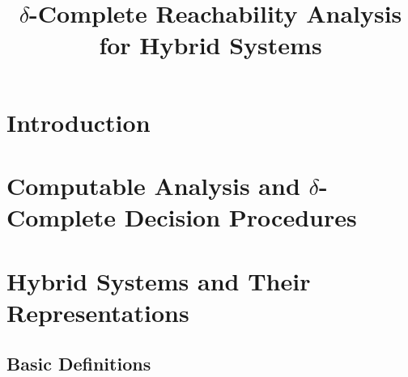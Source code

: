 \documentclass[envcountsect]{llncs}
\title{$\delta$-Complete Reachability Analysis for Hybrid Systems}
\institute{Carnegie Mellon University, Pittsburgh, PA 15213}
\begin{document}
\maketitle

\begin{abstract}
\end{abstract}

\section{Introduction}

\section{Computable Analysis and $\delta$-Complete Decision Procedures}

\section{Hybrid Systems and Their Representations}

\subsection{Basic Definitions}
\end{document}
